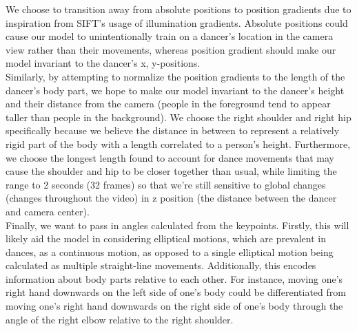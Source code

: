 We choose to transition away from absolute positions to position gradients due to inspiration from SIFT’s usage of illumination gradients. Absolute positions 
could cause our model to unintentionally train on a dancer’s location in the camera view rather than their movements, whereas position gradient should make our 
model invariant to the dancer’s x, y-positions.
\\
\indent Similarly, by attempting to normalize the position gradients to the length of the dancer’s body part, we hope to make our model invariant to the dancer’s height 
and their distance from the camera (people in the foreground tend to appear taller than people in the background). We choose the right shoulder and right hip 
specifically because we believe the distance in between to represent a relatively rigid part of the body with a length correlated to a person’s height. Furthermore, 
we choose the longest length found to account for dance movements that may cause the shoulder and hip to be closer together than usual, while limiting the range to 
2 seconds (32 frames) so that we’re still sensitive to global changes (changes throughout the video) in z position (the distance between the dancer and camera center).
\\
\indent Finally, we want to pass in angles calculated from the keypoints. Firstly, this will likely aid the model in considering elliptical motions, which are prevalent in dances, 
as a continuous motion, as opposed to a single elliptical motion being calculated as multiple straight-line movements. Additionally, this encodes information about body parts 
relative to each other. For instance, moving one’s right hand downwards on the left side of one’s body could be differentiated from moving one’s right hand downwards on the right
 side of one’s body through the angle of the right elbow relative to the right shoulder.




